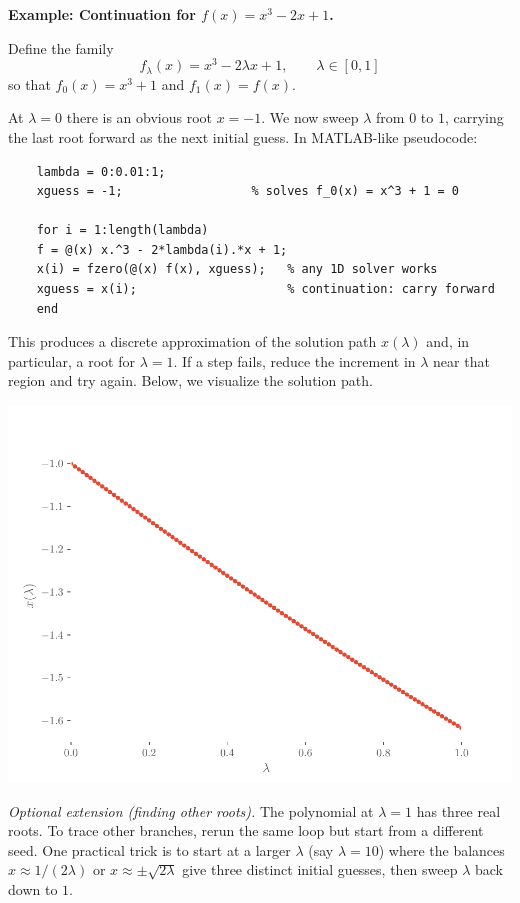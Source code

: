 \begin{exampleBox}
    \textbf{Example: Continuation for $f(x)=x^3-2x+1$.}
    
    Define the family
    $$
    f_{\lambda}(x)=x^3-2\lambda x+1,\qquad \lambda\in[0,1]
    $$
    so that $f_0(x)=x^3+1$ and $f_1(x)=f(x)$.
    
    At $\lambda=0$ there is an obvious root $x=-1$. We now sweep $\lambda$ from $0$ to $1$, carrying the last root forward as the next initial guess. In MATLAB-like pseudocode:
    
    \begin{verbatim}
    lambda = 0:0.01:1;
    xguess = -1;                  % solves f_0(x) = x^3 + 1 = 0
    
    for i = 1:length(lambda)
    f = @(x) x.^3 - 2*lambda(i).*x + 1;
    x(i) = fzero(@(x) f(x), xguess);   % any 1D solver works
    xguess = x(i);                     % continuation: carry forward
    end
    \end{verbatim}
    
    This produces a discrete approximation of the solution path $x(\lambda)$ and, in particular, a root for $\lambda=1$. If a step fails, reduce the increment in $\lambda$ near that region and try again. Below, we visualize the solution path.

    \begin{center}
        \includegraphics[width=.5\textwidth]{figs/nle/simple_continuation.pdf}
    \end{center}
    
    \emph{Optional extension (finding other roots).} The polynomial at $\lambda=1$ has three real roots. To trace other branches, rerun the same loop but start from a different seed. One practical trick is to start at a larger $\lambda$ (say $\lambda=10$) where the balances $x \approx 1/(2\lambda)$ or $x \approx \pm\sqrt{2\lambda}$ give three distinct initial guesses, then sweep $\lambda$ back down to $1$.
\end{exampleBox}

